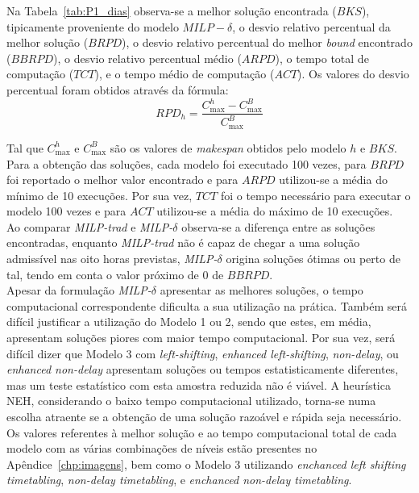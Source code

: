Na Tabela~\ref{tab:P1_dias} observa-se a melhor solução encontrada ($BKS$), tipicamente proveniente do modelo $MILP-\delta$, o desvio relativo percentual da melhor solução ($BRPD$), o desvio relativo percentual do melhor \textit{bound} encontrado ($BBRPD$), o desvio relativo percentual médio ($ARPD$), o tempo total de computação ($TCT$), e o tempo médio de computação ($ACT$). Os valores do desvio percentual foram obtidos através da fórmula:\\
$$RPD_{h}=\frac{C_{\max}^{h}-C_{\max}^{B}}{C_{\max}^{B}}$$

Tal que $C_{\max}^{h}$ e $C_{\max}^{B}$ são os valores de \textit{makespan} obtidos pelo modelo $h$ e $BKS$. Para a obtenção das soluções, cada modelo foi executado 100 vezes, para $BRPD$ foi reportado o melhor valor encontrado e para $ARPD$ utilizou-se a média do mínimo de 10 execuções. Por sua vez, $TCT$ foi o tempo necessário para executar o modelo 100 vezes e para $ACT$ utilizou-se a média do máximo de 10 execuções.\\

Ao comparar \textit{MILP-trad} e \textit{MILP-$\delta$} observa-se a diferença entre as soluções encontradas, enquanto \textit{MILP-trad} não é capaz de chegar a uma solução admissível nas oito horas previstas, \textit{MILP-$\delta$} origina soluções ótimas ou perto de tal, tendo em conta o valor próximo de 0 de $BBRPD$.\\

Apesar da formulação \textit{MILP-$\delta$} apresentar as melhores soluções, o tempo computacional correspondente dificulta a sua utilização na prática. Também será difícil justificar a utilização do Modelo 1 ou 2, sendo que estes, em média, apresentam soluções piores com maior tempo computacional. Por sua vez, será difícil dizer que Modelo 3 com \textit{left-shifting}, \textit{enhanced left-shifting}, \textit{non-delay}, ou \textit{enhanced non-delay} apresentam soluções ou tempos estatisticamente diferentes, mas um teste estatístico com esta amostra reduzida não é viável. A heurística NEH, considerando o baixo tempo computacional utilizado, torna-se numa escolha atraente se a obtenção de uma solução razoável e rápida seja necessário.\\

Os valores referentes à melhor solução e ao tempo computacional total de cada modelo  com as várias combinações de níveis estão presentes no Apêndice~\eqref{chp:imagens}, bem como o Modelo 3 utilizando \textit{enchanced left shifting timetabling}, \textit{non-delay timetabling}, e \textit{enchanced non-delay timetabling}.

